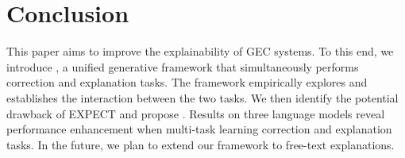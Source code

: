\section{Conclusion}
\label{sec:conclusion}

This paper aims to improve the explainability of GEC systems. To this end, we introduce \Method{}, a unified generative framework that simultaneously performs correction and explanation tasks. The framework empirically explores and establishes the interaction between the two tasks. We then identify the potential drawback of EXPECT and propose \Dataset{}. Results on three language models reveal performance enhancement when multi-task learning correction and explanation tasks. In the future, we plan to extend our framework to free-text explanations.









